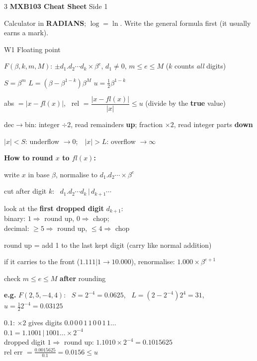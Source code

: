 \documentclass[8pt,a4paper]{extarticle}
\newcommand{\hd}[1]{\par\vspace{3pt}\noindent\colorbox{accent}{\parbox{\dimexpr\linewidth-2\fboxsep}{\color{white}\bfseries\strut #1}}\par\vspace{1pt}}
\newcommand{\sub}[1]{\textbf{\color{accent}#1}}
\newenvironment{ex}[1]{\par\vspace{2pt}\noindent\begin{lrbox}{\exbox}\begin{minipage}{\dimexpr\linewidth-2\fboxsep}\RaggedRight\color{grn}\textbf{e.g.} #1\par\setlength{\parskip}{1.5pt}}{\end{minipage}\end{lrbox}\colorbox{exbg}{\usebox{\exbox}}\par\vspace{1pt}}
\begin{document}
\raggedcolumns
\RaggedRight
\setlength{\parindent}{0pt}
\setlength{\abovedisplayskip}{2pt}\setlength{\belowdisplayskip}{2pt}
\setlength{\abovedisplayshortskip}{1pt}\setlength{\belowdisplayshortskip}{1pt}
\begin{multicols*}{3}
{\color{accent}\large\bfseries MXB103 Cheat Sheet} {\color{muted}\scriptsize Side 1}\par
{\scriptsize\color{muted}Calculator in \textbf{RADIANS}; $\log=\ln$. Write the general formula first (it usually earns a mark).}

\hd{W1 Floating point}
$F(\beta,k,m,M)$: $\pm d_1.d_2\cdots d_k\times\beta^e$, $d_1\ne0$, $m\le e\le M$ ($k$ counts \emph{all} digits)
\begin{tl}
\item $S=\beta^{m}$ \quad $L=(\beta-\beta^{1-k})\beta^{M}$ \quad $u=\tfrac12\beta^{1-k}$
\item abs $=|x-fl(x)|$, \ rel $=\dfrac{|x-fl(x)|}{|x|}\le u$ (divide by the \textbf{true} value)
\item dec$\to$bin: integer $\div2$, read remainders \textbf{up}; fraction $\times2$, read integer parts \textbf{down}
\item $|x|<S$: underflow $\to0$;\ \ $|x|>L$: overflow $\to\infty$
\end{tl}
\sub{How to round $x$ to $fl(x)$:}
\begin{der}
\item write $x$ in base $\beta$, normalise to $d_1.d_2\cdots\times\beta^e$
\item cut after digit $k$: \ $d_1.d_2\cdots d_k\,|\,d_{k+1}\cdots$
\item look at the \textbf{first dropped digit} $d_{k+1}$:\\ binary: $1\Rightarrow$ round up, $0\Rightarrow$ chop;\\ decimal: $\ge5\Rightarrow$ round up, $\le4\Rightarrow$ chop
\item round up = add 1 to the last kept digit (carry like normal addition)
\item if it carries to the front ($1.111|1\to10.000$), renormalise: $1.000\times\beta^{e+1}$
\item check $m\le e\le M$ \textbf{after} rounding
\end{der}
\begin{ex}{$F(2,5,-4,4)$: \ $S=2^{-4}=0.0625$, \ $L=(2-2^{-4})2^4=31$, \ $u=\frac12 2^{-4}=0.03125$}
$0.1$: $\times2$ gives digits $0.0\,0\,0\,1\,1\,0\,0\,1\,1\ldots$\\
$0.1=1.1001\,|\,1001\ldots\times2^{-4}$\\
dropped digit $1\Rightarrow$ round up: $1.1010\times2^{-4}=0.1015625$\\
rel err $=\frac{0.0015625}{0.1}=0.0156\le u$ \checkmark


\end{ex}
\end{multicols*}
\end{document}
